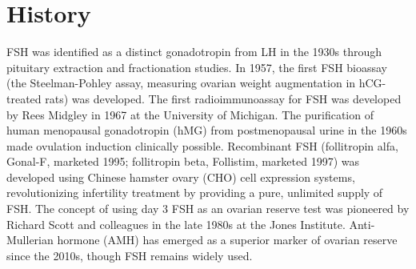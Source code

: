 \section*{History}
FSH was identified as a distinct gonadotropin from LH in the 1930s through pituitary extraction and fractionation studies. In 1957, the first FSH bioassay (the Steelman-Pohley assay, measuring ovarian weight augmentation in hCG-treated rats) was developed. The first radioimmunoassay for FSH was developed by Rees Midgley in 1967 at the University of Michigan. The purification of human menopausal gonadotropin (hMG) from postmenopausal urine in the 1960s made ovulation induction clinically possible. Recombinant FSH (follitropin alfa, Gonal-F, marketed 1995; follitropin beta, Follistim, marketed 1997) was developed using Chinese hamster ovary (CHO) cell expression systems, revolutionizing infertility treatment by providing a pure, unlimited supply of FSH. The concept of using day 3 FSH as an ovarian reserve test was pioneered by Richard Scott and colleagues in the late 1980s at the Jones Institute. Anti-Mullerian hormone (AMH) has emerged as a superior marker of ovarian reserve since the 2010s, though FSH remains widely used.

